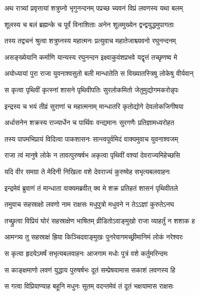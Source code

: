 
\twolineshloka
{अथ रात्र्यां प्रवृत्तायां शत्रुघ्नो भृगुनन्दनम्}
{पप्रच्छ च्यवनं विप्रं लवणस्य यथा बलम्} %

\twolineshloka
{शूलस्य च बलं ब्रह्मन्के च पूर्वं विनाशिताः}
{अनेन शूलमुख्येन द्वन्द्वयुद्धमुपागताः} %

\twolineshloka
{तस्य तद्वचनं श्रुत्वा शत्रुघ्नस्य महात्मनः}
{प्रत्युवाच महातेजाश्च्यवनो रघुनन्दनम्} %

\twolineshloka
{असङ्ख्येयानि कर्माणि यान्यस्य रघुनन्दन}
{इक्ष्वाकुवंशप्रभवे यद्वृत्तं तच्छृणष्व मे} %

\twolineshloka
{अयोध्यायां पुरा राजा युवनाश्वसुतो बली}
{मान्धातेति स विख्यातस्त्रिषु लोकेषु वीर्यवान्} %

\twolineshloka
{स कृत्वा पृथिवीं कृत्स्नां शासने पृथिवीपतिः}
{सुरलोकमितो जेतुमुद्योगमकरोन्नृपः} %

\twolineshloka
{इन्द्रस्य च भयं तीव्रं सुराणां च महात्मनाम्}
{मान्धातरि कृतोद्योगे देवलोकजिगीषया} %

\twolineshloka
{अर्धासनेन शक्रस्य राज्यार्धेन च पार्थिवः}
{वन्द्यमानः सुरगणैः प्रतिज्ञामध्यरोहत} %

\twolineshloka
{तस्य पापमभिप्रायं विदित्वा पाकशासनः}
{सान्त्वपूर्वमिदं वाक्यमुवाच युवनाश्वजम्} %

\twolineshloka
{राजा त्वं मानुषे लोके न तावत्पुरुषर्षभ}
{अकृत्वा पृथिवीं वश्यां देवराज्यमिहेच्छसि} %

\twolineshloka
{यदि वीर समग्रा ते मेदिनी निखिला वशे}
{देवराज्यं कुरुष्वेह सभृत्यबलवाहनः} %

\twolineshloka
{इन्द्रमेवं ब्रुवाणं तं मान्धाता वाक्यमब्रवीत्}
{क्व मे शक्र प्रतिहतं शासनं पृथिवीतले} %

\twolineshloka
{तमुवाच सहस्राक्षो लवणो नाम राक्षसः}
{मधुपुत्रो मधुवने न तेऽऽज्ञां कुरुतेऽनघ} %

\twolineshloka
{तच्छ्रुत्वा विप्रियं घोरं सहस्राक्षेण भाषितम्}
{व्रीडितोऽवाङ्मुखो राजा व्याहर्तुं न शशाक ह} %

\twolineshloka
{आमन्त्र्य तु सहस्राक्षं ह्रिया किञ्चिदवाङ्मुखः}
{पुनरेवागमच्छ्रीमानिमं लोकं नरेश्वरः} %

\twolineshloka
{स कृत्वा हृदयेऽमर्षं सभृत्यबलवाहनः}
{आजगाम मधोः पुत्रं वशे कर्तुमरिन्दमः} %

\twolineshloka
{स काङ्क्षमाणो लवणं युद्धाय पुरुषर्षभः}
{दूतं सम्प्रेषयामास सकाशं लवणस्य हि} %

\twolineshloka
{स गत्वा विप्रियाण्याह बहूनि मधुनः सुतम्}
{वदन्तमेवं तं दूतं भक्षयामास राक्षसः} %


